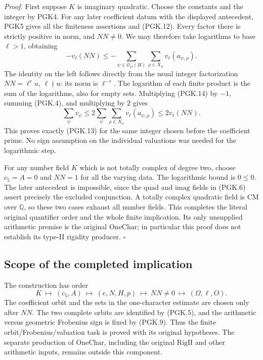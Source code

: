 \emph{Proof.}
First suppose \(K\) is imaginary quadratic. Choose the
constants and the integer by PGK4. For any later coefficient
datum with the displayed antecedent, PGK5 gives all the
finiteness assertions and (PGK.12). Every factor there is
strictly positive in norm, and \(NN\ne0\). We may therefore
take logarithms to base \(\ell>1\), obtaining
\[
 -v_\ell(NN)\le
       -\sum_{\psi\in\mathcal O_O(H)}\sum_{\rho\in X_\psi}
                            v_\ell(a_{\psi,\rho}).
 \tag{PGK.14}
\]
The identity on the left follows directly from the usual
integer factorization \(NN=\ell^r u\), \(\ell\nmid u\):
its norm is \(\ell^{-r}\). The logarithm of each finite
product is the sum of the logarithms, also for empty sets.
Multiplying (PGK.14) by \(-1\), summing (PGK.4), and
multiplying by \(2\) gives
\[
 \sum_\psi v_\psi
 \le2\sum_\psi\sum_{\rho\in X_\psi}v_\ell(a_{\psi,\rho})
 \le2v_\ell(NN).
\]
This proves exactly (PGK.13) for the same integer chosen
before the coefficient prime. No sign assumption on the
individual valuations was needed for the logarithmic step.

For any number field \(K\) which is not totally complex of
degree two, choose \(c_5=A=0\) and \(NN=1\) for all the
varying data. The logarithmic bound is \(0\le0\). The later
antecedent is impossible, since the \(\mathrm{quad}\) and
\(\mathrm{imag}\) fields in (PGK.6) assert precisely the
excluded conjunction. A totally complex quadratic field is
CM over \(\mathbb Q\), so these two cases exhaust all
number fields. This completes the literal original quantifier
order and the whole finite implication. Its only unsupplied
arithmetic premise is the original \(\mathrm{OneChar}\);
in particular this proof does not establish its type-II
rigidity producer. \hfill\(\square\)

\subsection{Scope of the completed implication}

The construction has order
\[
 K\ \longmapsto\ (c_5,A)\ \longmapsto\ (e,N,H,p)
 \ \longmapsto\ NN\ne0\ \longmapsto\ (\Omega,\ell,O).
\]
The coefficient orbit and the sets in the one-character
estimate are chosen only after \(NN\). The two complete
orbits are identified by (PGK.5), and the arithmetic versus
geometric Frobenius sign is fixed by (PGK.9). Thus the
finite orbit/Frobenius/valuation task is proved with its
original hypotheses. The separate production of
\(\mathrm{OneChar}\), including the original
\(\mathrm{RigII}\) and other arithmetic inputs, remains outside
this component.
